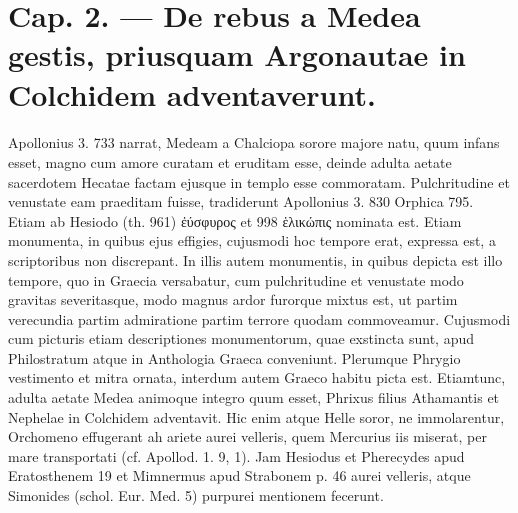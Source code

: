 \documentclass[a4paper, 11pt, oneside, polutonikogreek, german]{article}
\begin{document}
\section{Cap. 2. --- De rebus a Medea gestis, priusquam Argonautae in Colchidem adventaverunt.}
\paragraph{}
Apollonius 3. 733 narrat, Medeam a Chalciopa sorore majore natu, quum infans esset, magno cum amore curatam et eruditam esse, deinde adulta aetate sacerdotem Hecatae factam ejusque in templo esse commoratam. Pulchritudine et venustate eam praeditam fuisse, tradiderunt Apollonius 3. 830 Orphica 795. Etiam ab Hesiodo (th. 961) ἐύσφυρος et 998 ἑλικώπις nominata est. Etiam monumenta, in quibus ejus effigies, cujusmodi hoc tempore erat, expressa est, a scriptoribus non discrepant. In illis autem monumentis, in quibus depicta est illo tempore, quo in Graecia versabatur, cum pulchritudine et venustate modo gravitas severitasque, modo magnus ardor furorque mixtus est, ut partim verecundia partim admiratione partim terrore quodam commoveamur. Cujusmodi cum picturis etiam descriptiones monumentorum, quae exstincta sunt, apud Philostratum atque in Anthologia Graeca conveniunt. Plerumque Phrygio vestimento et mitra ornata, interdum autem Graeco habitu picta est. Etiamtunc, adulta aetate Medea animoque integro quum esset, Phrixus filius Athamantis et Nephelae in Colchidem adventavit. Hic enim atque Helle soror, ne immolarentur, Orchomeno effugerant ah ariete aurei velleris, quem Mercurius iis miserat, per mare transportati (cf. Apollod. 1. 9, 1). Jam Hesiodus et Pherecydes apud Eratosthenem 19 et Mimnermus apud Strabonem p. 46 aurei velleris, atque Simonides (schol. Eur. Med. 5) purpurei mentionem fecerunt.
\end{document}
